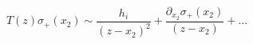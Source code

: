 \begin{equation}
T(z)\sigma_+(x_2) \sim \frac{h_i}{(z-x_2)^2}+\frac{\partial_{x_2}\sigma_+(x_2)}{(z-x_2)}+\ldots
\end{equation}

